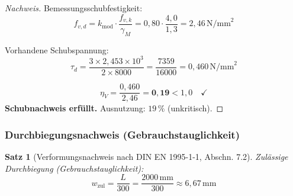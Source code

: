 ﻿\documentclass[12pt,a4paper]{article}
\theoremstyle{definition}
\theoremstyle{plain}
\newtheorem{theorem}{Satz}
\theoremstyle{remark}
\begin{document}
\begin{proof}[Nachweis]
Bemessungsschubfestigkeit:
\begin{equation*}
  f_{v,d} = k_{\text{mod}} \cdot \frac{f_{v,k}}{\gamma_M}
          = 0{,}80 \cdot \frac{4{,}0}{1{,}3} = 2{,}46\,\text{N/mm}^2
\end{equation*}

Vorhandene Schubspannung:
\begin{equation*}
  \tau_d = \frac{3 \times 2{,}453 \times 10^3}{2 \times 8000}
         = \frac{7359}{16000} = 0{,}460\,\text{N/mm}^2
\end{equation*}

\begin{equation*}
  \eta_V = \frac{0{,}460}{2{,}46} = \mathbf{0{,}19} < 1{,}0 \quad \checkmark
\end{equation*}
\textbf{Schubnachweis erfüllt.} Ausnutzung: $19\,\%$ (unkritisch).
\end{proof}

\subsubsection{Durchbiegungsnachweis (Gebrauchstauglichkeit)}

\begin{theorem}[Verformungsnachweis nach DIN EN 1995-1-1, Abschn. 7.2]
Zulässige Durchbiegung (Gebrauchstauglichkeit):
\begin{equation}
  w_{\text{zul}} = \frac{L}{300} = \frac{2000\,\text{mm}}{300} \approx 6{,}67\,\text{mm}
\end{equation}
\end{theorem}
\end{document}

